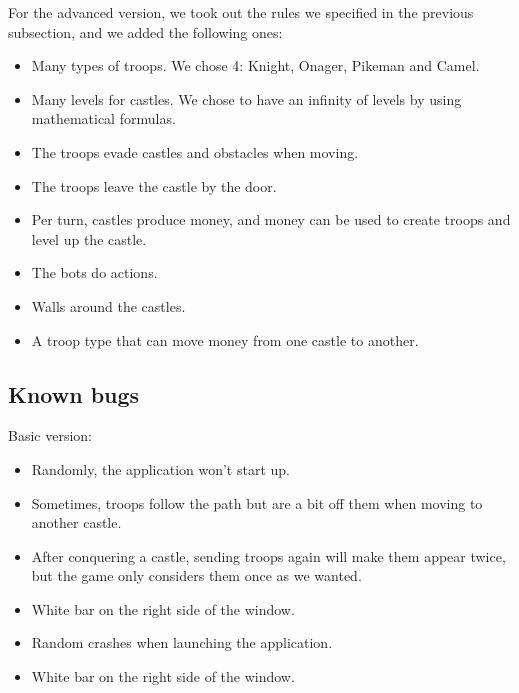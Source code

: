 \documentclass[12pt, a4paper]{report}
\begin{document}
For the advanced version, we took out the rules we specified in the previous subsection, and we added the following ones:

\begin{itemize}
    \item Many types of troops. We chose 4: Knight, Onager, Pikeman and Camel.
    \item Many levels for castles. We chose to have an infinity of levels by using mathematical formulas.
    \item The troops evade castles and obstacles when moving.
    \item The troops leave the castle by the door.
    \item Per turn, castles produce money, and money can be used to create troops and level up the castle.
    \item The bots do actions.
\end{itemize}


\begin{itemize}
    \item Walls around the castles.
    \item A troop type that can move money from one castle to another.
\end{itemize}

\subsection*{Known bugs}

Basic version:

\begin{itemize}
    \item Randomly, the application won't start up.
    \item Sometimes, troops follow the path but are a bit off them when moving to another castle.
    \item After conquering a castle, sending troops again will make them appear twice, but the game only considers them once as we wanted.
    \item White bar on the right side of the window.
\end{itemize}


\begin{itemize}
    \item Random crashes when launching the application.
    \item White bar on the right side of the window.
\end{itemize}
\end{document}

